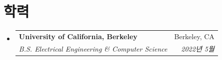 \documentclass[10pt]{article}
\makeatletter
\newcommand{\resumeSubheading}[4]{
  \vspace{-2pt}\item[]
    \begin{tabular*}{\linewidth}[t]{l@{\extracolsep{\fill}}r}
      \textbf{#1} & #2 \\
      \textit{\small#3} & \textit{\small #4} \\
    \end{tabular*}\vspace{-5pt}
}
\makeatother
\begin{document}
\section{학력}
\begin{itemize}[leftmargin=0.15in, label={}, itemsep=0pt]
    \resumeSubheading
        {University of California, Berkeley}{Berkeley, CA}
        {B.S. Electrical Engineering \& Computer Science}{2022년 5월}
\end{itemize}
\end{document}
